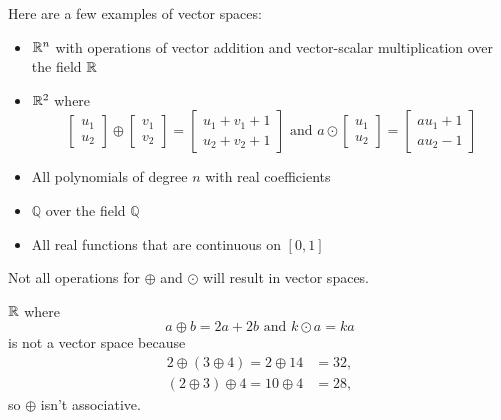 Here are a few examples of vector spaces:
\begin{example}
	\hspace{1pt}
	\begin{itemize}
		\item
		$\mathbb{R}^n$ with operations of vector addition and vector-scalar multiplication over the field $\mathbb{R}$
		\item
		$\mathbb{R}^2$ where
		\begin{equation*}
			\begin{bmatrix}
				u_1 \\ u_2
			\end{bmatrix} \oplus \begin{bmatrix}
				v_1 \\ v_2
			\end{bmatrix} = \begin{bmatrix}
				u_1 + v_1 + 1 \\
				u_2 + v_2 + 1
			\end{bmatrix} \text{ and } a\odot\begin{bmatrix}
				u_1 \\ u_2
			\end{bmatrix} = \begin{bmatrix}
				au_1 + 1 \\ au_2 - 1
			\end{bmatrix}
		\end{equation*}
		\item
		All polynomials of degree $n$ with real coefficients
		\item
		$\mathbb{Q}$ over the field $\mathbb{Q}$
		\item
		All real functions that are continuous on $[0,1]$
	\end{itemize}
\end{example}

Not all operations for $\oplus$ and $\odot$ will result in vector spaces.
\begin{example}
	$\mathbb{R}$ where
	\begin{equation*}
		a \oplus b = 2a + 2b \text { and } k\odot a = ka
	\end{equation*}
	is not a vector space because
	\begin{align*}
		2 \oplus (3 \oplus 4) = 2 \oplus 14 &= 32, \\
		(2 \oplus 3) \oplus 4 = 10 \oplus 4 &= 28,
	\end{align*}
	so $\oplus$ isn't associative.
\end{example}